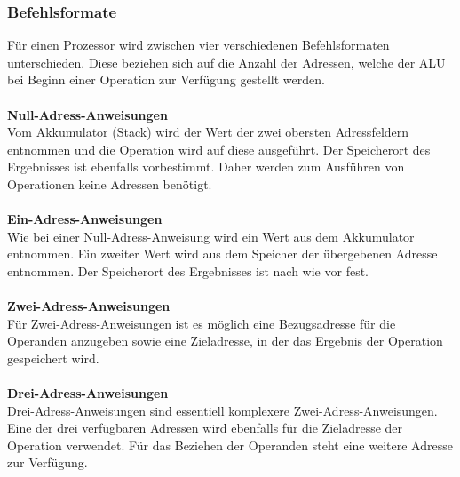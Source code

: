 \documentclass[12pt]{article}
\begin{document}
\subsubsection{Befehlsformate}
Für einen Prozessor wird zwischen vier verschiedenen Befehlsformaten unterschieden. Diese beziehen sich auf die Anzahl der Adressen, welche der ALU bei Beginn einer Operation zur Verfügung gestellt werden.\\ \\
\textbf{Null-Adress-Anweisungen}\\
Vom Akkumulator (Stack) wird der Wert der zwei obersten Adressfeldern entnommen und die Operation wird auf diese ausgeführt. Der Speicherort des Ergebnisses ist ebenfalls vorbestimmt. Daher werden zum Ausführen von Operationen keine Adressen benötigt.\\ \\
\textbf{Ein-Adress-Anweisungen}\\
Wie bei einer Null-Adress-Anweisung wird ein Wert aus dem Akkumulator entnommen. Ein zweiter Wert wird aus dem Speicher der übergebenen Adresse entnommen. Der Speicherort des Ergebnisses ist nach wie vor fest.\\ \\
\textbf{Zwei-Adress-Anweisungen}\\
Für Zwei-Adress-Anweisungen ist es möglich eine Bezugsadresse für die Operanden anzugeben sowie eine Zieladresse, in der das Ergebnis der Operation gespeichert wird.\\ \\
\textbf{Drei-Adress-Anweisungen}\\
Drei-Adress-Anweisungen sind essentiell komplexere Zwei-Adress-Anweisungen. Eine der drei verfügbaren Adressen wird ebenfalls für die Zieladresse der Operation verwendet. Für das Beziehen der Operanden steht eine weitere Adresse zur Verfügung.\\
\end{document}

